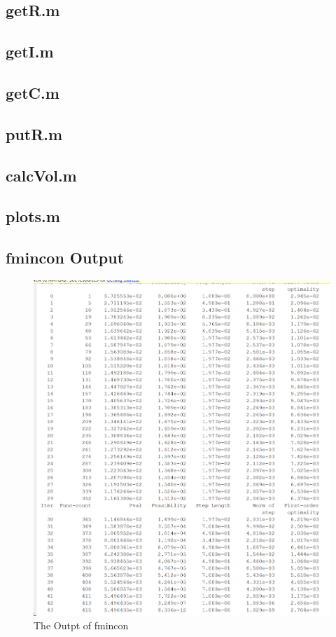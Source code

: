 \documentclass[11pt]{article}%
\begin{document}
\subsection{getR.m}
\label{sec:getR}

\newpage
\subsection{getI.m}
\label{sec:getI}

\newpage
\subsection{getC.m}
\label{sec:getC}

\newpage
\subsection{putR.m}
\label{sec:putR}

\newpage
\subsection{calcVol.m}
\label{sec:calcVol}

\newpage
\subsection{plots.m}
\label{sec:plots}

\subsection{fmincon Output}
\label{sec:fincon}
\begin{figure}[h!]
    \centering
    \includegraphics[width=0.75\linewidth]{out.png}
    \caption{ The Outpt of fmincon }
    \label{fig:fmincon}
\end{figure}
\end{document}

